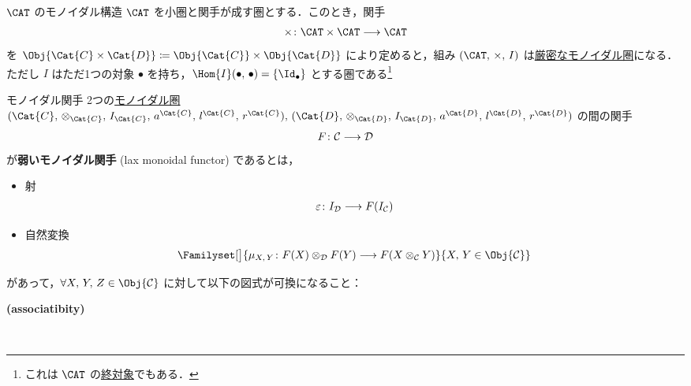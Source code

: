 \documentclass[TQFT_main]{subfiles}
\begin{document}
    \begin{myexample}[label=ex:Cat-monidal]{$\CAT$ のモノイダル構造}
        $\CAT$ を小圏と関手が成す圏とする．このとき，関手
        \begin{align}
            \times \colon \CAT \times \CAT \lto \CAT
        \end{align}
        を $\Obj{\Cat{C} \times \Cat{D}} \coloneqq \Obj{\Cat{C}} \times \Obj{\Cat{D}}$ により定めると，組み $(\CAT,\, \times,\, I)$ は\hyperref[redef:monoidal]{厳密なモノイダル圏}になる．ただし $I$ はただ1つの対象 $\bullet$ を持ち，$\Hom{I}(\bullet,\,\bullet) = \{\Id_{\bullet}\}$ とする圏である\footnote{これは $\CAT$ の\hyperref[def:colim]{終対象}でもある．}
    \end{myexample}


    \begin{mydef}[label=redef:monidal-functor,breakable]{モノイダル関手}
        2つの\hyperref[def:monoidal-category]{モノイダル圏} $(\Cat{C},\, \otimes_{\Cat{C}},\, I_{\Cat{C}},\, a^{\Cat{C}},\, l^{\Cat{C}},\, r^{\Cat{C}}),\, (\Cat{D},\, \otimes_{\Cat{D}},\, I_{\Cat{D}},\, a^{\Cat{D}},\, l^{\Cat{D}},\, r^{\Cat{D}})$ の間の関手
        \begin{align}
            F \colon \mathcal{C} \longrightarrow \mathcal{D}
        \end{align}
        が\textbf{弱いモノイダル関手} (lax monoidal functor) であるとは，
        \begin{itemize}
            \item 射
            \begin{align}
                \varepsilon \colon I_{\mathcal{D}} \longrightarrow F(I_{\mathcal{C}})
            \end{align}
            
            \item 自然変換
            \begin{align}
                \Familyset[\big]{\mu_{X,\, Y} \colon F(X) \otimes_{\mathcal{D}} F(Y) \lto F(X \otimes_{\mathcal{C}} Y)}{X,\, Y \in \Obj{\mathcal{C}}}
            \end{align}
        \end{itemize}
        があって，$\forall X,\, Y,\, Z \in \Obj{\mathcal{C}}$ に対して以下の図式が可換になること：
        \begin{description}
            \item[\textbf{(associatibity)}]　
            

\end{description}
\end{mydef}
\end{document}
